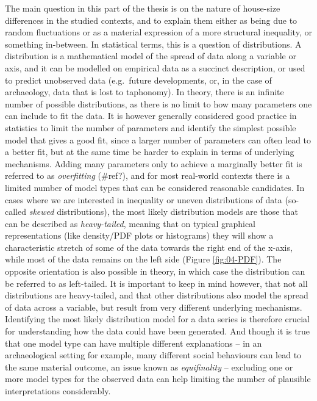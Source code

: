 \documentclass[
  12pt,
  a4paper, twoside]{book}
\begin{document}
The main question in this part of the thesis is on the nature of house-size differences in the studied contexts, and to explain them either as being due to random fluctuations or as a material expression of a more structural inequality, or something in-between. In statistical terms, this is a question of distributions. A distribution is a mathematical model of the spread of data along a variable or axis, and it can be modelled on empirical data as a succinct description, or used to predict unobserved data (e.g.~future developments, or, in the case of archaeology, data that is lost to taphonomy). In theory, there is an infinite number of possible distributions, as there is no limit to how many parameters one can include to fit the data. It is however generally considered good practice in statistics to limit the number of parameters and identify the simplest possible model that gives a good fit, since a larger number of parameters can often lead to a better fit, but at the same time be harder to explain in terms of underlying mechanisms. Adding many parameters only to achieve a marginally better fit is referred to as \emph{overfitting} (\#ref?), and for most real-world contexts there is a limited number of model types that can be considered reasonable candidates. In cases where we are interested in inequality or uneven distributions of data (so-called \emph{skewed} distributions), the most likely distribution models are those that can be described as \emph{heavy-tailed}, meaning that on typical graphical representations (like density/PDF plots or histograms) they will show a characteristic stretch of some of the data towards the right end of the x-axis, while most of the data remains on the left side (Figure \ref{fig:04-PDF}). The opposite orientation is also possible in theory, in which case the distribution can be referred to as left-tailed. It is important to keep in mind however, that not all distributions are heavy-tailed, and that other distributions also model the spread of data across a variable, but result from very different underlying mechanisms. Identifying the most likely distribution model for a data series is therefore crucial for understanding how the data could have been generated. And though it is true that one model type can have multiple different explanations -- in an archaeological setting for example, many different social behaviours can lead to the same material outcome, an issue known as \emph{equifinality} -- excluding one or more model types for the observed data can help limiting the number of plausible interpretations considerably.
\end{document}
